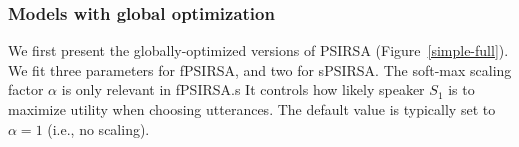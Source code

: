 \documentclass[10pt,a4paper]{article}
\begin{document}
\subsubsection{Models with global optimization}

We first present the globally-optimized versions of PSIRSA (Figure~\ref{simple-full}).
We fit three parameters for fPSIRSA, and two for sPSIRSA.
The soft-max scaling factor $\alpha$ is only relevant in fPSIRSA.s
It controls how likely speaker $S_1$ is to maximize utility when choosing utterances. 
The default value is typically set to $\alpha=1$ (i.e., no scaling). 
\end{document}
